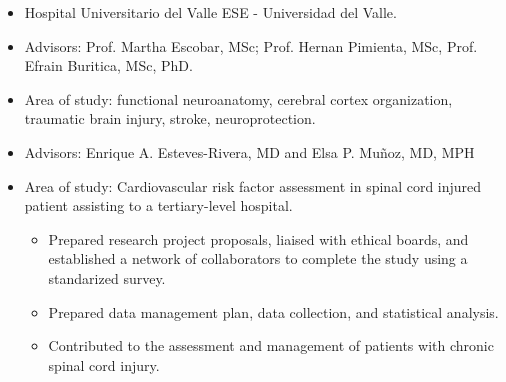 \documentclass[10pt,a4paper,ragged2e]{altacv}
\begin{document}

  \begin{itemize}
  \item Hospital Universitario del Valle ESE - Universidad del Valle.
   \end{itemize}

\begin{itemize}
  \item {Advisors: Prof. Martha Escobar, MSc; Prof. Hernan Pimienta, MSc, Prof. Efrain Buritica, MSc, PhD.}
  \item {Area of study: functional neuroanatomy, cerebral cortex organization, traumatic brain injury, stroke, neuroprotection.}
\end{itemize}

\begin{itemize}
  \item {Advisors: Enrique A. Esteves-Rivera, MD and Elsa P. Muñoz, MD, MPH}
  \item {Area of study: Cardiovascular risk factor assessment in spinal cord injured patient assisting to a tertiary-level hospital.}
  \begin{itemize}
    \item {Prepared research project proposals, liaised with ethical boards, and established a network of collaborators to complete the study using a standarized survey.}
    \item {Prepared data management plan, data collection, and statistical analysis.}
    \item {Contributed to the assessment and management of patients with chronic spinal cord injury.}
  \end{itemize}
\end{itemize}
\end{document}
